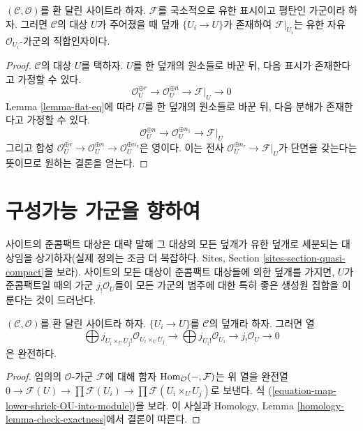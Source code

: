 \begin{lemma}
\label{lemma-flat-locally-finite-presentation}
$(\mathcal{C}, \mathcal{O})$를 환 달린 사이트라 하자. $\mathcal{F}$를
국소적으로 유한 표시이고 평탄인 가군이라 하자. 그러면 $\mathcal{C}$의 대상
$U$가 주어졌을 때 덮개 $\{U_i \to U\}$가 존재하여
$\mathcal{F}|_{U_i}$는 유한 자유 $\mathcal{O}_{U_i}$-가군의 직합인자이다.
\end{lemma}

\begin{proof}
$\mathcal{C}$의 대상 $U$를 택하자. $U$를 한 덮개의 원소들로 바꾼 뒤,
다음 표시가 존재한다고 가정할 수 있다.
$$
\mathcal{O}_U^{\oplus r} \to
\mathcal{O}_U^{\oplus n} \to \mathcal{F}|_U \to 0
$$
Lemma \ref{lemma-flat-eq}에 따라 $U$를 한 덮개의 원소들로 바꾼 뒤,
다음 분해가 존재한다고 가정할 수 있다.
$$
\mathcal{O}_U^{\oplus n} \to
\mathcal{O}_U^{\oplus n_1} \to \mathcal{F}|_U
$$
그리고 합성
$\mathcal{O}_U^{\oplus r} \to \mathcal{O}_U^{\oplus n}
\to \mathcal{O}_U^{\oplus n_r}$은 영이다. 이는 전사
$\mathcal{O}_U^{\oplus n_r} \to \mathcal{F}|_U$가 단면을 갖는다는 뜻이므로
원하는 결론을 얻는다.
\end{proof}











\section{구성가능 가군을 향하여}
\label{section-constructible}

\noindent
사이트의 준콤팩트 대상은 대략 말해 그 대상의 모든 덮개가 유한 덮개로
세분되는 대상임을 상기하자(실제 정의는 조금 더 복잡하다. Sites, Section
\ref{sites-section-quasi-compact}을 보라). 사이트의 모든 대상이 준콤팩트
대상들에 의한 덮개를 가지면, $U$가 준콤팩트일 때의 가군
$j_!\mathcal{O}_U$들이 모든 가군의 범주에 대한 특히 좋은 생성원 집합을
이룬다는 것이 드러난다.

\begin{lemma}
\label{lemma-covering-gives-surjection}
$(\mathcal{C}, \mathcal{O})$를 환 달린 사이트라 하자. $\{U_i \to U\}$를
$\mathcal{C}$의 덮개라 하자. 그러면 열
$$
\bigoplus j_{U_i \times_U U_j!}\mathcal{O}_{U_i \times_U U_j} \to
\bigoplus j_{U_i!}\mathcal{O}_{U_i} \to j_!\mathcal{O}_U \to 0
$$
은 완전하다.
\end{lemma}

\begin{proof}
임의의 $\mathcal{O}$-가군 $\mathcal{F}$에 대해 함자
$\mathop{\mathrm{Hom}}\nolimits_\mathcal{O}(-, \mathcal{F})$는 위 열을 완전열
$0 \to \mathcal{F}(U) \to \prod \mathcal{F}(U_i) \to
\prod \mathcal{F}(U_i \times_U U_j)$로 보낸다. 식
(\ref{equation-map-lower-shriek-OU-into-module})을 보라. 이 사실과 Homology,
Lemma \ref{homology-lemma-check-exactness}에서 결론이 따른다.
\end{proof}

